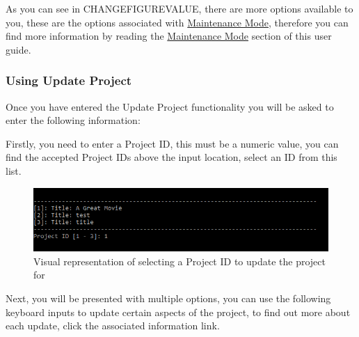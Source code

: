 \documentclass[
  english,
  a4paper,
,tablecaptionabove
]{scrartcl}
\begin{document}
As you can see in CHANGEFIGUREVALUE, there are more options available to
you, these are the options associated with
\protect\hyperlink{using-maintenance-mode}{Maintenance Mode}, therefore
you can find more information by reading the
\protect\hyperlink{using-maintenance-mode}{Maintenance Mode} section of
this user guide.

\newpage

\hypertarget{using-update-project}{%
\subsubsection{Using Update Project}\label{using-update-project}}

Once you have entered the Update Project functionality you will be asked
to enter the following information:

Firstly, you need to enter a Project ID, this must be a numeric value,
you can find the accepted Project IDs above the input location, select
an ID from this list.

\begin{figure}
\centering
\includegraphics{images/user-guide/maintenance-mode/update-project-select-id.png}
\caption{Visual representation of selecting a Project ID to update the
project for}
\end{figure}

Next, you will be presented with multiple options, you can use the
following keyboard inputs to update certain aspects of the project, to
find out more about each update, click the associated information link.
\end{document}
